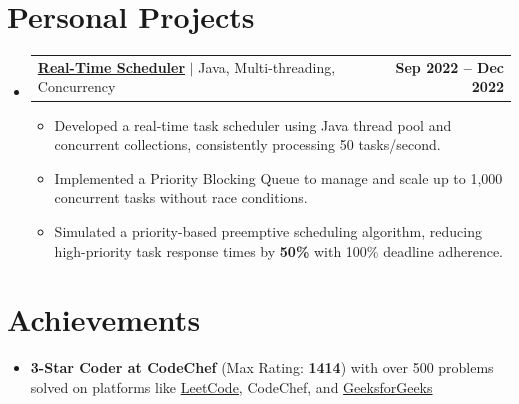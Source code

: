 \documentclass[letterpaper,11pt]{article}
\makeatletter
\newcommand{\resumeItem}[1]{
  \item\small{{#1 \vspace{-2pt}}}
}
\newcommand{\resumeProjectHeading}[2]{
    \item
    \begin{tabular*}{1.001\textwidth}{l@{\extracolsep{\fill}}r}
      \small#1 & \textbf{\small #2}\\
    \end{tabular*}\vspace{-6pt}
}
\newcommand{\resumeSubHeadingListStart}{\begin{itemize}[leftmargin=0.0in, label={}]}
\newcommand{\resumeSubHeadingListEnd}{\end{itemize}}
\newcommand{\resumeItemListStart}{\begin{itemize}}
\newcommand{\resumeItemListEnd}{\end{itemize}\vspace{-5pt}}
\makeatother
\begin{document}
\section{Personal Projects}
\resumeSubHeadingListStart

\resumeProjectHeading
{\href{https://github.com/gokulsaraswat/Real-Time-Schedular}
{\textbf{Real-Time Scheduler}} $|$ \small{Java, Multi-threading, Concurrency}}{Sep 2022 -- Dec 2022}
\resumeItemListStart
    \resumeItem{Developed a real-time task scheduler using Java thread pool and concurrent collections, consistently processing 50 tasks/second.}
    \resumeItem{Implemented a Priority Blocking Queue to manage and scale up to 1,000 concurrent tasks without race conditions.}
    \resumeItem{Simulated a priority-based preemptive scheduling algorithm, reducing high-priority task response times by \textbf{50\%} with 100\% deadline adherence.}
\resumeItemListEnd

\resumeSubHeadingListEnd


\section{Achievements}
\resumeItemListStart
    \resumeItem{\textbf{3-Star Coder at CodeChef} (Max Rating: \textbf{1414}) with over 500 problems solved on platforms like \href{https://leetcode.com/u/gokulsaraswat/}{LeetCode}, CodeChef, and \href{https://www.geeksforgeeks.org/profile/gokulsaraswat}{GeeksforGeeks}}
\resumeItemListEnd
\end{document}
